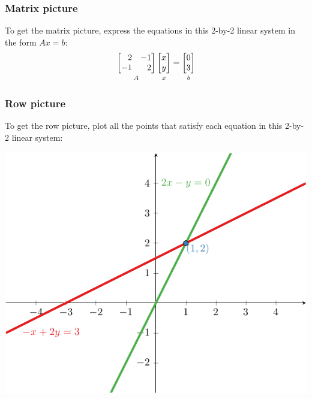 \documentclass[../main.tex]{subfiles}
\begin{document}
\subsubsection{Matrix picture}
To get the matrix picture, express the equations in this 2-by-2 linear system in the form $Ax = b$:
\[
    \underbracket[0pt][0pt]{
        \begin{bmatrix*}[r]
            2 & -1 \\
            -1 & 2
        \end{bmatrix*}
    }_{\mathstrut A}
    \underbracket[0pt][0pt]{
        \begin{bmatrix*}
            x \\
            y
        \end{bmatrix*}
    }_{\mathstrut x}
    =
    \underbracket[0pt][0pt]{
        \begin{bmatrix*}
            0 \\
            3
        \end{bmatrix*}
    }_{\mathstrut b}
\]

\subsubsection{Row picture}
To get the row picture, plot all the points that satisfy each equation in this 2-by-2 linear system:

\begingroup
\centering
\includegraphics[width = \columnwidth]{../figures/fig01_2d-row-pic/figure.pdf}
\par
\endgroup
\end{document}
